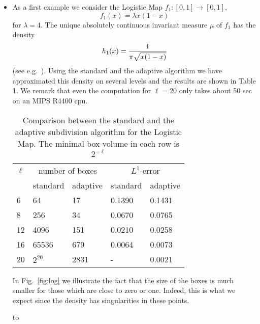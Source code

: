 \documentclass[cvs,envcountsect]{svjour}
\begin{document}
\begin{itemize}
\item[{\it 1.}]
As a first example we consider the Logistic Map $f_1:[0,1]\to [0,1]$,
\[
f_1(x)=\lambda x(1-x)
\]
for $\lambda=4$. The unique absolutely continuous invariant measure $\mu$
of $f_1$ has the density
\[
h_1(x)={1\over \pi \sqrt{x(1-x)}}
\]
(see e.g.\ \cite{Lasota:94}). Using the standard and the adaptive
algorithm we have approximated this density on several levels
and the results are shown in Table 1.  We remark that even
the computation for $\ell=20$ only takes about 50 sec
on an MIPS R4400 cpu.

\begin{table} \label{tab:log}
\caption{Comparison between the standard and the adaptive subdivision
algorithm for the Logistic Map.  The minimal box volume in each row
is $2^{-\ell}$}
\begin{tabular}{ l l l l l }
\hline
$\ell$ &
\multicolumn{2}{c}{number of boxes} & \multicolumn{2}{c}{$L^1$-error} \\
  & standard & adaptive & standard & adaptive \\ \hline
6 & 64       &   17 & 0.1390 & 0.1431   \\
8 & 256      &   34 & 0.0670 & 0.0765 \\
12 & 4096    &  151 & 0.0210 & 0.0258 \\
16 & 65536   &  679 & 0.0064 & 0.0073 \\
20 & $2^{20}$  & 2831 &  -     & 0.0021 \\
\hline
\end{tabular}
\end{table}

In Fig.~\ref{fig:log} we illustrate the fact that the size of the boxes
is much smaller for those which are close to zero or one.  Indeed, this is
what we expect since the density has singularities in these points.

\begin{figure*}
\vbox{\hbox to}
\label{fig:log}
\end{figure*}


\end{itemize}
\end{document}
